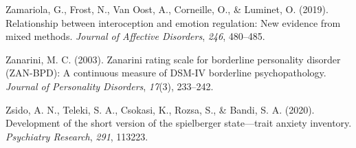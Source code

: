\documentclass[
  jou,
  floatsintext,
  longtable,
  nolmodern,
  notxfonts,
  notimes,
  colorlinks=true,linkcolor=blue,citecolor=blue,urlcolor=blue]{apa7}
\newlength{\cslhangindent}
\newenvironment{CSLReferences}[2] %
 {\begin{list}{}{%
  \setlength{\itemindent}{0pt}
  \setlength{\leftmargin}{0pt}
  \setlength{\parsep}{0pt}
  \ifodd #1
   \setlength{\leftmargin}{\cslhangindent}
   \setlength{\itemindent}{-1\cslhangindent}
  \fi
  \setlength{\itemsep}{#2\baselineskip}}}
 {\end{list}}
\begin{document}
\begin{CSLReferences}{1}{0}
Zamariola, G., Frost, N., Van Oost, A., Corneille, O., \& Luminet, O.
(2019). Relationship between interoception and emotion regulation: New
evidence from mixed methods. \emph{Journal of Affective Disorders},
\emph{246}, 480--485.

Zanarini, M. C. (2003). Zanarini rating scale for borderline personality
disorder (ZAN-BPD): A continuous measure of DSM-IV borderline
psychopathology. \emph{Journal of Personality Disorders}, \emph{17}(3),
233--242.

Zsido, A. N., Teleki, S. A., Csokasi, K., Rozsa, S., \& Bandi, S. A.
(2020). Development of the short version of the spielberger
state---trait anxiety inventory. \emph{Psychiatry Research}, \emph{291},
113223.

\end{CSLReferences}
\end{document}
